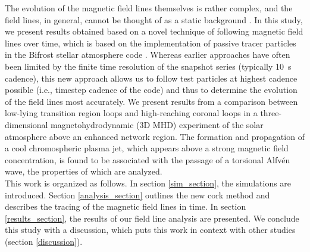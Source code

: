 \documentclass{aa}
\begin{document}
The evolution of the magnetic field lines themselves is rather complex, and the field lines, in general, cannot be thought of as a static background \citep[see, {\emph{e.g.}},][]{leenaarts+al:2015}. 
In this study, we present results obtained based on a novel technique of following magnetic field lines over time, which is based on the implementation of passive tracer particles in the Bifrost stellar atmosphere code \citep{zacharias+al:2018}. Whereas earlier approaches have often been limited by the finite time resolution of the snapshot series (typically 10~s cadence), this new approach allows us to follow test particles at highest cadence possible (i.e., timestep cadence of the code) and thus to determine the evolution of the field lines most accurately. We present results from a comparison between low-lying transition region loops and high-reaching coronal loops in a three-dimensional magnetohydrodynamic (3D MHD) experiment of the solar atmosphere above an enhanced network region. The formation and propagation of a cool chromospheric plasma jet, which appears above a strong magnetic field concentration, is found to be associated with the passage of a torsional Alfv\'en wave, the properties of which are analyzed.\\




This work is organized as follows. In section \ref{sim_section}, the simulations are introduced. Section \ref{analysis_section} outlines the new cork method and describes the tracing of the  magnetic field lines in time. In section \ref{results_section}, the results of our field line analysis are presented. 
We conclude this study with a discussion, which puts this work in context with other studies (section \ref{discussion}).
\end{document}
